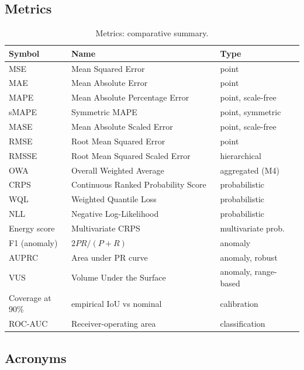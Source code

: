 \documentclass{article}
\begin{document}
\subsection{Metrics}\label{metrics}

\begin{table}[t]
\centering
\caption{Metrics: comparative summary.}
\label{tab:metrics}
\begin{tabular}{>{\raggedright\arraybackslash}p{0.2143\linewidth}
  >{\raggedright\arraybackslash}p{0.5000\linewidth}
  >{\raggedright\arraybackslash}p{0.2857\linewidth}}
\toprule
Symbol & Name & Type \\
\midrule
MSE & Mean Squared Error & point \\
MAE & Mean Absolute Error & point \\
MAPE & Mean Absolute Percentage Error & point, scale-free \\
sMAPE & Symmetric MAPE & point, symmetric \\
MASE & Mean Absolute Scaled Error & point, scale-free \\
RMSE & Root Mean Squared Error & point \\
RMSSE & Root Mean Squared Scaled Error & hierarchical \\
OWA & Overall Weighted Average & aggregated (M4) \\
CRPS & Continuous Ranked Probability Score & probabilistic \\
WQL & Weighted Quantile Loss & probabilistic \\
NLL & Negative Log-Likelihood & probabilistic \\
Energy score & Multivariate CRPS & multivariate prob. \\
F1 (anomaly) & \(2PR/(P+R)\) & anomaly \\
AUPRC & Area under PR curve & anomaly, robust \\
VUS & Volume Under the Surface & anomaly, range-based \\
Coverage at 90\% & empirical IoU vs nominal & calibration \\
ROC-AUC & Receiver-operating area & classification \\
\end{tabular}
\end{table}

\subsection{Acronyms}\label{acronyms}
\end{document}
